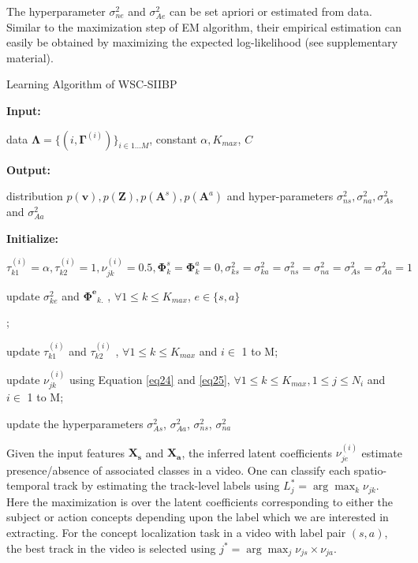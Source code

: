 \documentclass[runningheads]{llncs}
\begin{document}
The hyperparameter $\sigma_{ne}^2$ and $\sigma_{Ae}^2$ can be set apriori or estimated from data. Similar to the maximization step of EM algorithm, their empirical estimation can easily be obtained by maximizing the expected log-likelihood (see supplementary material). 

\begin{algorithm}[!htp]
\caption{Learning Algorithm of WSC-SIIBP}
\label{inference}
\begin{algorithmic}[1]
\State \textbf{Input:} \parbox[t]{\dimexpr\linewidth-\algorithmicindent}{data $\mathbf{\Lambda} = \lbrace (i, \mathbf{\Gamma}^{(i)})\rbrace_{i\in 1\dots M}$, constant $\alpha, K_{max}$, $C$\strut}
\State \textbf{Output:} \parbox[t]{\dimexpr\linewidth-\algorithmicindent}{distribution $p(\mathbf{v}), p(\mathbf{Z}), p(\mathbf{A}^s), p(\mathbf{A}^a)$ and hyper-parameters $\sigma_{ns}^2, \sigma_{na}^2, \sigma_{As}^2$ and $\sigma_{Aa}^2$\strut}
\State \textbf{Initialize:} \parbox[t]{\dimexpr\linewidth-\algorithmicindent}{$\tau_{k1}^{(i)} = \alpha, \tau_{k2}^{(i)} = 1, \nu_{jk}^{(i)} = 0.5, \mathbf{\Phi}_k^s = \mathbf{\Phi}_k^a = 0, \sigma_{ks}^2 = \sigma_{ka}^2 = \sigma_{ns}^2 = \sigma_{na}^2 = \sigma_{As}^2  = \sigma_{Aa}^2 = 1$\strut}
\Repeat
\Repeat
\State \parbox[t]{\dimexpr\linewidth-\algorithmicindent}{update $\sigma_{ke}^2$ and $\mathbf{\Phi^e}_{k.}$ %
, $\forall 1\leq k \leq K_{max}$, $e \in \{s,a\}$\strut;}
\State \parbox[t]{\dimexpr\linewidth-\algorithmicindent}{update $\tau_{k1}^{(i)}$ and $\tau_{k2}^{(i)}$ %
, $\forall 1\leq k \leq K_{max}$ and $i\in$ 1 to M;\strut}
\State \parbox[t]{\dimexpr\linewidth-\algorithmicindent}{update $\nu_{jk}^{(i)}$ using Equation \eqref{eq24} and \eqref{eq25}, $\forall 1\leq k \leq K_{max}, 1\leq j \leq N_i$ and $i\in$ 1 to M;\strut}
\State \parbox[t]{\dimexpr\linewidth-\algorithmicindent}{update the hyperparameters $\sigma_{As}^2$, $\sigma_{Aa}^2$, $\sigma_{ns}^2$, $\sigma_{na}^2$ \strut}
\end{algorithmic}
\end{algorithm}

Given the input features $\mathbf{X_s}$ and $\mathbf{X_a}$, the inferred latent coefficients $\nu_{je}^{(i)}$ estimate presence/absence of associated classes in a video. One can classify each spatio-temporal track by estimating the track-level labels using $L^*_j = \arg\max_{k} \nu_{jk}$. Here the maximization is over the latent coefficients corresponding to either the subject or action concepts depending upon the label which we are interested in extracting. For the concept localization task in a video with label pair $(s,a)$, the best track in the video is selected using $j^* = \arg\max_{j} \nu_{js}\times\nu_{ja}$.
\end{document}
